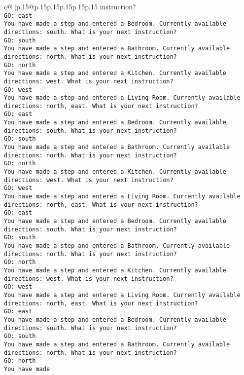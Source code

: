 \documentclass{article}
\begin{document}
{\begin{supertabular}{c@{$\;$}|p{.15\linewidth}@{}p{.15\linewidth}p{.15\linewidth}p{.15\linewidth}p{.15\linewidth}p{.15\linewidth}}
{{{instruction?\\ \tt GO: east\\ \tt You have made a step and entered a Bedroom. Currently available directions: south. What is your next instruction?\\ \tt GO: south\\ \tt You have made a step and entered a Bathroom. Currently available directions: north. What is your next instruction?\\ \tt GO: north\\ \tt You have made a step and entered a Kitchen. Currently available directions: west. What is your next instruction?\\ \tt GO: west\\ \tt You have made a step and entered a Living Room. Currently available directions: north, east. What is your next instruction?\\ \tt GO: east\\ \tt You have made a step and entered a Bedroom. Currently available directions: south. What is your next instruction?\\ \tt GO: south\\ \tt You have made a step and entered a Bathroom. Currently available directions: north. What is your next instruction?\\ \tt GO: north\\ \tt You have made a step and entered a Kitchen. Currently available directions: west. What is your next instruction?\\ \tt GO: west\\ \tt You have made a step and entered a Living Room. Currently available directions: north, east. What is your next instruction?\\ \tt GO: east\\ \tt You have made a step and entered a Bedroom. Currently available directions: south. What is your next instruction?\\ \tt GO: south\\ \tt You have made a step and entered a Bathroom. Currently available directions: north. What is your next instruction?\\ \tt GO: north\\ \tt You have made a step and entered a Kitchen. Currently available directions: west. What is your next instruction?\\ \tt GO: west\\ \tt You have made a step and entered a Living Room. Currently available directions: north, east. What is your next instruction?\\ \tt GO: east\\ \tt You have made a step and entered a Bedroom. Currently available directions: south. What is your next instruction?\\ \tt GO: south\\ \tt You have made a step and entered a Bathroom. Currently available directions: north. What is your next instruction?\\ \tt GO: north\\ \tt You have made }}}
\end{supertabular}}
\end{document}

